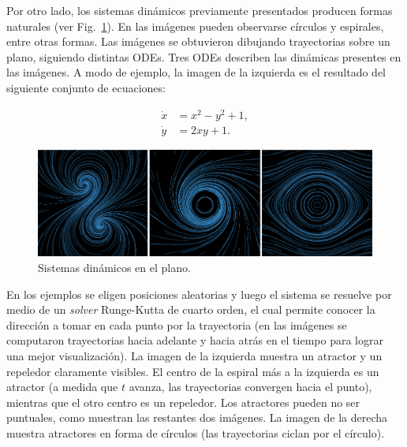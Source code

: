 \documentclass[oneside,a4paper,spanish,links]{amca}
\begin{document}
Por otro lado, los sistemas din\'amicos previamente presentados producen formas naturales (ver Fig.~\ref{fg:fig3}). En las im\'agenes pueden observarse c\'irculos y espirales, entre otras formas. Las im\'agenes se obtuvieron dibujando trayectorias sobre un plano, siguiendo distintas ODEs. Tres ODEs describen las din\'amicas presentes en las im\'agenes. A modo de ejemplo, la imagen de la izquierda es el resultado del siguiente conjunto de ecuaciones:

\begin{equation} \label{eq:simple}  
  \begin{aligned}
    \dot{x} &= x^{2}-y^{2}+1,\\
    \dot{y} &= 2xy+1.
  \end{aligned}
\end{equation}


\begin{figure}[htb!]
  \centerline{\includegraphics[scale=0.28]{fig3}}
  \caption{Sistemas din\'amicos en el plano.}
  \label{fg:fig3}
\end{figure}

En los ejemplos se eligen posiciones aleatorias y luego el sistema se resuelve por medio de un {\em solver} Runge-Kutta de cuarto orden, el cual permite conocer la direcci\'on a tomar en cada punto por la trayectoria (en las im\'agenes se computaron trayectorias hacia adelante y hacia atrás en el tiempo para lograr una mejor visualizaci\'on). La imagen de la izquierda muestra un atractor y un repeledor claramente visibles. El centro de la espiral m\'as a la izquierda es un atractor (a medida que $t$ avanza, las trayectorias convergen hacia el punto), mientras que el otro centro es un repeledor. Los atractores pueden no ser puntuales, como muestran las restantes dos im\'agenes. La imagen de la derecha muestra atractores en forma de c\'irculos (las trayectorias ciclan por el c\'irculo).
\end{document}
